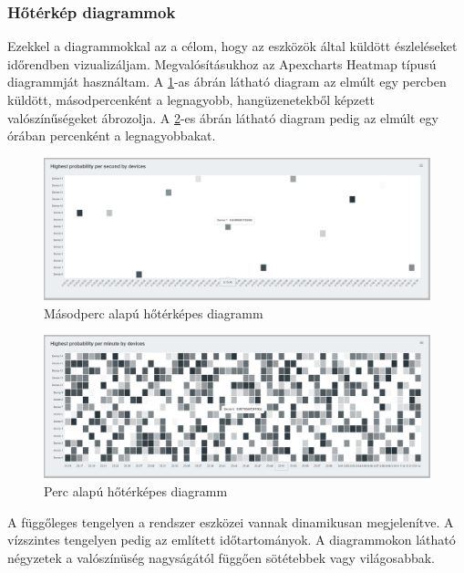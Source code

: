 \subsubsection{Hőtérkép diagrammok}
Ezekkel a diagrammokkal az a célom, hogy az eszközök által küldött észleléseket időrendben vizualizáljam.
Megvalósításukhoz az Apexcharts Heatmap típusú diagrammját használtam.
A \ref{fig:dashboard-heatmap-second}-as ábrán látható diagram az elmúlt egy percben küldött, másodpercenként a legnagyobb, hangüzenetekből képzett valószínűségeket ábrozolja.
A \ref{fig:dashboard-heatmap-minute}-es ábrán látható diagram pedig az elmúlt egy órában percenként a legnagyobbakat.
\begin{figure}[!ht]
    \centering
    \includegraphics[width=150mm, keepaspectratio]{figures/second-heatmap.png}
    \caption{Másodperc alapú hőtérképes diagramm}
    \label{fig:dashboard-heatmap-second}
\end{figure}
\begin{figure}[!ht]
    \centering
    \includegraphics[width=150mm, keepaspectratio]{figures/minute-heatmap.png}
    \caption{Perc alapú hőtérképes diagramm}
    \label{fig:dashboard-heatmap-minute}
\end{figure}

A függőleges tengelyen a rendszer eszközei vannak dinamikusan megjelenítve.
A vízszintes tengelyen pedig az említett időtartományok.
A diagrammokon látható négyzetek a valószínüség nagyságától függően sötétebbek vagy világosabbak.
\newpage
